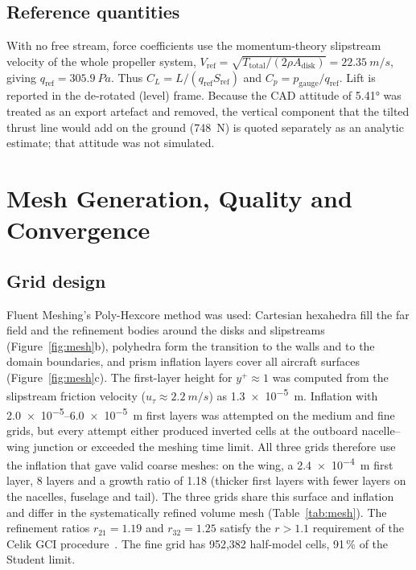 \documentclass[10pt,a4paper]{article}
\begin{document}
\subsection{Reference quantities}
With no free stream, force coefficients use the momentum-theory slipstream velocity of the whole propeller system,
$V_{\text{ref}}=\sqrt{T_{\text{total}}/(2\rho A_{\text{disk}})}=\SI{22.35}{m/s}$, giving
$q_{\text{ref}}=\SI{305.9}{Pa}$. Thus $C_L=L/(q_{\text{ref}}S_{\text{ref}})$ and $C_p=p_{\text{gauge}}/q_{\text{ref}}$.
Lift is reported in the de-rotated (level) frame. Because the CAD attitude of \ang{5.41} was treated as an export
artefact and removed, the vertical component that the tilted thrust line would add on the ground
(\SI{748}{N}) is quoted separately as an analytic estimate; that attitude was not simulated.

\section{Mesh Generation, Quality and Convergence}
\label{sec:mesh}
\subsection{Grid design}
Fluent Meshing's Poly-Hexcore method was used: Cartesian hexahedra fill the far field and the refinement bodies
around the disks and slipstreams (Figure~\ref{fig:mesh}b), polyhedra form the transition to the walls and to the
domain boundaries, and prism inflation layers cover all aircraft surfaces (Figure~\ref{fig:mesh}c). The first-layer
height for $y^+\approx1$ was computed from the slipstream friction velocity ($u_\tau\approx\SI{2.2}{m/s}$) as
\SI{1.3e-5}{m}. Inflation with \num{2.0e-5}--\SI{6.0e-5}{m} first layers was attempted on the medium and fine
grids, but every attempt either produced inverted cells at the outboard nacelle--wing junction or exceeded the
meshing time limit. All three grids therefore use the inflation that gave valid coarse meshes: on the wing, a
\SI{2.4e-4}{m} first layer, 8 layers and a growth ratio of 1.18 (thicker first layers with fewer layers on the
nacelles, fuselage and tail). The three grids share this surface and inflation and differ in the systematically
refined volume mesh (Table~\ref{tab:mesh}). The refinement ratios $r_{21}=1.19$ and $r_{32}=1.25$ satisfy the
$r>1.1$ requirement of the Celik GCI procedure~\cite{celik2008gci}. The fine grid has 952,382 half-model cells,
91\,\% of the Student limit.
\end{document}
